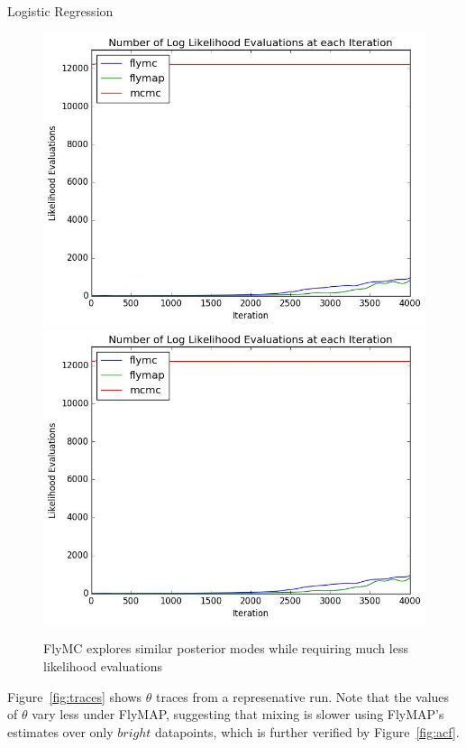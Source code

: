\documentclass[final]{beamer}
\newlength{\onecolwid}
\newlength{\twocolwid}
\begin{document}
\begin{frame}[t]
\begin{columns}[t]
\begin{column}{\twocolwid}
\begin{columns}[t,totalwidth=\twocolwid]
\begin{column}{\onecolwid}
\begin{block}{Logistic Regression}
\begin{figure}
  \centering
  \hspace{1.3cm}\includegraphics[width=0.8\linewidth]{Figures/evals_per_iter.png}
  \newline
  \includegraphics[width=0.8\linewidth]{Figures/evals_per_iter.png}
  \caption{FlyMC explores similar posterior modes while requiring much less likelihood evaluations}
  \label{fig:evals}
\end{figure}

Figure~\ref{fig:traces} shows $\theta$ traces from a represenative run. Note that
the values of $\theta$ vary less under FlyMAP, suggesting that mixing is slower
using FlyMAP's estimates over only $bright$ datapoints, which is further
verified by Figure~\ref{fig:acf}.


\end{block}
\end{column}
\end{columns}
\end{column}
\end{columns}
\end{frame}
\end{document}
